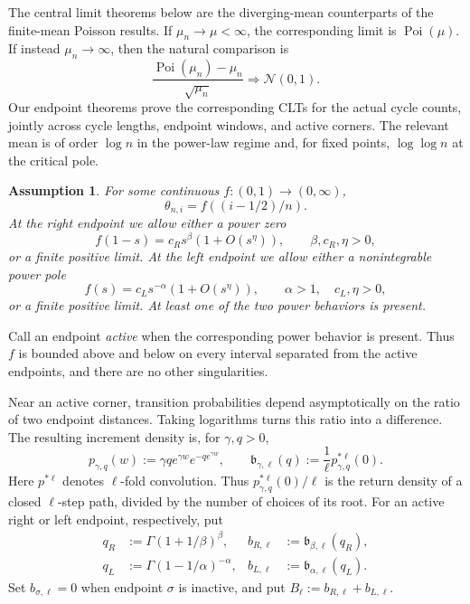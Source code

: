 \documentclass[11pt]{article}
\theoremstyle{remark}
\theoremstyle{plain}
\newtheorem{assumption}[theorem]{Assumption}
\newcommand{\Poi}{\operatorname{Poi}}
\begin{document}
The central limit theorems below are the diverging-mean counterparts of the
finite-mean Poisson results.  If $\mu_n\to\mu<\infty$, the corresponding
limit is $\Poi(\mu)$.  If instead $\mu_n\to\infty$, then the natural
comparison is
\[
 \frac{\Poi(\mu_n)-\mu_n}{\sqrt{\mu_n}}
 \Longrightarrow\mathcal N(0,1).
\]
Our endpoint theorems prove the corresponding CLTs for the actual cycle
counts, jointly across cycle lengths, endpoint windows, and active corners.
The relevant mean is of order $\log n$ in the power-law regime and, for fixed
points, $\log\log n$ at the critical pole.

\begin{assumption}\label{ass:simple-power-profile}
For some continuous $f:(0,1)\to(0,\infty)$,
\[
 \theta_{n,i}=f((i-1/2)/n).
\]
At the right endpoint we allow either a power zero
\[
 f(1-s)=c_Rs^\beta(1+O(s^\eta)),
 \qquad \beta,c_R,\eta>0,
\]
or a finite positive limit.  At the left endpoint we allow either a
nonintegrable power pole
\[
 f(s)=c_Ls^{-\alpha}(1+O(s^\eta)),
 \qquad \alpha>1,\quad c_L,\eta>0,
\]
or a finite positive limit.  At least one of the two power behaviors is
present.
\end{assumption}

Call an endpoint \emph{active} when the corresponding power behavior is
present.  Thus $f$ is bounded above and below on every interval separated
from the active endpoints, and there are no other singularities.

Near an active corner, transition probabilities depend asymptotically on the
ratio of two endpoint distances.  Taking logarithms turns this ratio into a
difference.  The resulting increment density is, for $\gamma,q>0$,
\begin{equation}\label{eq:generic-power-kernel}
 p_{\gamma,q}(w):=\gamma q e^{\gamma w}e^{-qe^{\gamma w}},
 \qquad
 \mathfrak b_{\gamma,\ell}(q):=\frac1\ell p_{\gamma,q}^{*\ell}(0).
\end{equation}
Here $p^{*\ell}$ denotes $\ell$-fold convolution.  Thus
$p_{\gamma,q}^{*\ell}(0)/\ell$ is the return density of a closed $\ell$-step
path, divided by the number of choices of its root.
For an active right or left endpoint, respectively, put
\begin{align}
 q_R&:=\Gamma(1+1/\beta)^\beta,
 &b_{R,\ell}&:=\mathfrak b_{\beta,\ell}(q_R),\label{eq:simple-q-right}\\
 q_L&:=\Gamma(1-1/\alpha)^{-\alpha},
 &b_{L,\ell}&:=\mathfrak b_{\alpha,\ell}(q_L).\label{eq:simple-q-left}
\end{align}
Set $b_{\sigma,\ell}=0$ when endpoint $\sigma$ is inactive, and put
$B_\ell:=b_{R,\ell}+b_{L,\ell}$.
\end{document}
